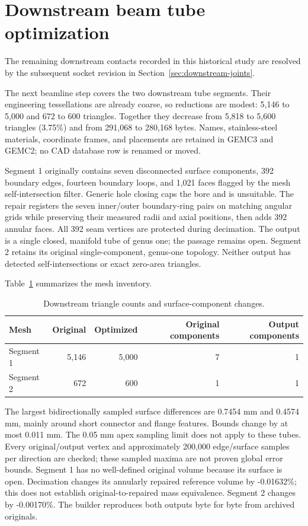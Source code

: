 \FloatBarrier
\section{Downstream beam tube optimization}

The remaining downstream contacts recorded in this historical study are resolved by the subsequent socket
revision in Section~\ref{sec:downstream-joints}.

The next beamline step covers the two downstream tube segments. Their engineering tessellations are already
coarse, so reductions are modest: 5,146 to 5,000 and 672 to 600 triangles. Together they decrease from 5,818
to 5,600 triangles (3.75\%) and from 291,068 to 280,168 bytes. Names, stainless-steel materials, coordinate
frames, and placements are retained in GEMC3 and GEMC2; no CAD database row is renamed or moved.

Segment 1 originally contains seven disconnected surface components, 392 boundary edges, fourteen boundary
loops, and 1,021 faces flagged by the mesh self-intersection filter. Generic hole closing caps the bore and
is unsuitable. The repair registers the seven inner/outer boundary-ring pairs on matching angular grids
while preserving their measured radii and axial positions, then adds 392 annular faces. All 392 seam
vertices are protected during decimation. The output is a single closed, manifold tube of genus one; the
passage remains open. Segment 2 retains its original single-component, genus-one topology. Neither output
has detected self-intersections or exact zero-area triangles.

Table~\ref{tab:downstream-meshes} summarizes the mesh inventory.

\begin{table}[htbp]
\centering
\caption{Downstream triangle counts and surface-component changes.}
\label{tab:downstream-meshes}
\begin{tabular}{lrrrr}
\toprule
Mesh & Original & Optimized & Original components & Output components \\
\midrule
Segment 1 & 5,146 & 5,000 & 7 & 1 \\
Segment 2 & 672 & 600 & 1 & 1 \\
\bottomrule
\end{tabular}
\end{table}

The largest bidirectionally sampled surface differences are 0.7454 mm and 0.4574 mm, mainly around short
connector and flange features. Bounds change by at most 0.011 mm. The 0.05 mm apex sampling limit does not
apply to these tubes. Every original/output vertex and approximately 200,000 edge/surface samples per
direction are checked; these sampled maxima are not proven global error bounds. Segment 1 has no
well-defined original volume because its surface is open. Decimation changes its annularly repaired
reference volume by -0.01632\%; this does not establish original-to-repaired mass equivalence. Segment 2
changes by -0.00170\%. The builder reproduces both outputs byte for byte from archived originals.

